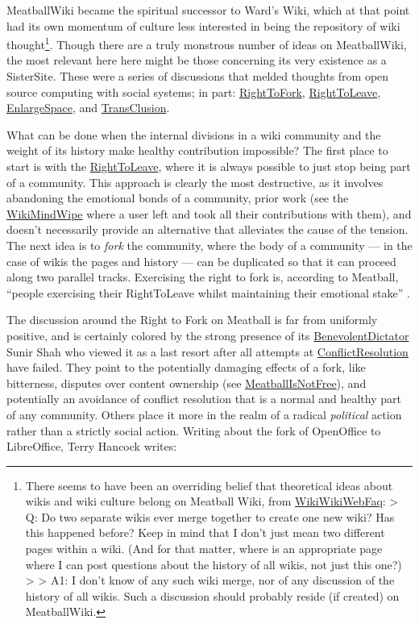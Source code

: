\documentclass[10pt]{tufte-book}
\begin{document}
MeatballWiki became the spiritual successor to Ward's Wiki, which at
that point had its own momentum of culture less interested in being the
repository of wiki thought\footnote{There seems to have been an
  overriding belief that theoretical ideas about wikis and wiki culture
  belong on Meatball Wiki, from
  \href{http://wiki.c2.com/?WikiWikiWebFaq}{WikiWikiWebFaq}:
  \textgreater{} Q: Do two separate wikis ever merge together to create
  one new wiki? Has this happened before? Keep in mind that I don't just
  mean two different pages within a wiki. (And for that matter, where is
  an appropriate page where I can post questions about the history of
  all wikis, not just this one?) \textgreater{} \textgreater{} A1: I
  don't know of any such wiki merge, nor of any discussion of the
  history of all wikis. Such a discussion should probably reside (if
  created) on MeatballWiki.}. Though there are a truly monstrous number
of ideas on MeatballWiki, the most relevant here here might be those
concerning its very existence as a SisterSite. These were a series of
discussions that melded thoughts from open source computing with social
systems; in part:
\href{http://meatballwiki.org/wiki/RightToFork}{RightToFork},
\href{http://meatballwiki.org/wiki/RightToLeave}{RightToLeave},
\href{http://meatballwiki.org/wiki/EnlargeSpace}{EnlargeSpace}, and
\href{http://meatballwiki.org/wiki/TransClusion}{TransClusion}.

What can be done when the internal divisions in a wiki community and the
weight of its history make healthy contribution impossible? The first
place to start is with the
\href{http://meatballwiki.org/wiki/RightToLeave}{RightToLeave}, where it
is always possible to just stop being part of a community. This approach
is clearly the most destructive, as it involves abandoning the emotional
bonds of a community, prior work (see the
\href{http://wiki.c2.com/?WikiMindWipe}{WikiMindWipe} where a user left
and took all their contributions with them), and doesn't necessarily
provide an alternative that alleviates the cause of the tension. The
next idea is to \emph{fork} the community, where the body of a community
--- in the case of wikis the pages and history --- can be duplicated so
that it can proceed along two parallel tracks. Exercising the right to
fork is, according to Meatball, ``people exercising their RightToLeave
whilst maintaining their emotional stake'' \citep{MeatballWikiRightToLeave} .

The discussion around the Right to Fork on Meatball is far from
uniformly positive, and is certainly colored by the strong presence of
its
\href{http://meatballwiki.org/wiki/BenevolentDictator}{BenevolentDictator}
Sunir Shah who viewed it as a last resort after all attempts at
\href{http://meatballwiki.org/wiki/ConflictResolution}{ConflictResolution}
have failed. They point to the potentially damaging effects of a fork,
like bitterness, disputes over content ownership (see
\href{http://meatballwiki.org/wiki/MeatballIsNotFree}{MeatballIsNotFree}),
and potentially an avoidance of conflict resolution that is a normal and
healthy part of any community. Others place it more in the realm of a
radical \emph{political} action rather than a strictly social action.
Writing about the fork of OpenOffice to LibreOffice, Terry Hancock
writes:
\end{document}
